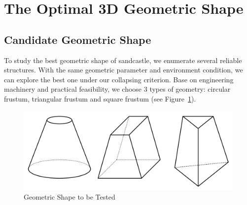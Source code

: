 \documentclass{mcmthesis}		    %
\begin{document}
	\section{The Optimal 3D Geometric Shape }
	
	
	
    \subsection{Candidate Geometric Shape}
    To study the best geometric shape of sandcastle, we enumerate several reliable structures. With the same geometric parameter and environment condition, we can explore the best one under our collapsing criterion. Base on engineering machinery and practical feasibility\cite{pakpour2012construct}, we choose 3 types of geometry: circular frustum, triangular frustum and square frustum (see Figure~\ref{fig:3d}).
    
	\begin{figure}[htbp!]
	    \centering
	    \includegraphics[width=0.6\columnwidth]{3d.pdf}
	    \caption{Geometric Shape to be Tested}
	    \label{fig:3d}
	\end{figure}
    
\end{document}

